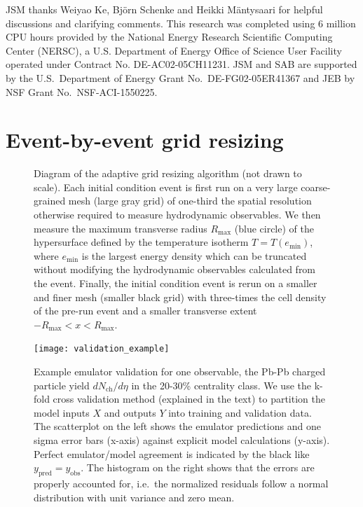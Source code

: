 \documentclass[aps,prc,reprint,amsmath,nofootinbib]{revtex4-1}
\newcommand{\nch}{N_\text{ch}}
\begin{document}
\medskip

\begin{acknowledgments}
  JSM thanks Weiyao Ke, Bj\"orn Schenke and Heikki M\"antysaari for helpful discussions and clarifying comments.
  This research was completed using 6 million CPU hours provided by the National Energy Research Scientific Computing Center (NERSC), a U.S. Department of Energy Office of Science User Facility operated under Contract No. DE-AC02-05CH11231.
  JSM and SAB are supported by the U.S.\ Department of Energy Grant No.\ DE-FG02-05ER41367 and JEB by NSF Grant No.\ NSF-ACI-1550225.
\end{acknowledgments}



\appendix

\section{Event-by-event grid resizing}
\label{app:adaptive_grid}

\begin{figure}
  \caption{
    \label{fig:adaptive_grid}
    Diagram of the adaptive grid resizing algorithm (not drawn to scale).
    Each initial condition event is first run on a very large coarse-grained mesh (large gray grid) of one-third the spatial resolution otherwise required to measure hydrodynamic observables.
    We then measure the maximum transverse radius $R_\text{max}$ (blue circle) of the hypersurface defined by the temperature isotherm $T = T(e_\text{min})$, where $e_\text{min}$ is the largest energy density which can be truncated without modifying the hydrodynamic observables calculated from the event.
    Finally, the initial condition event is rerun on a smaller and finer mesh (smaller black grid) with three-times the cell density of the pre-run event and a smaller transverse extent $-R_\text{max} < x < R_\text{max}$.
  }
\end{figure}

\begin{figure}
  \texttt{[image: validation\_example]}
  \caption{
    \label{fig:validation_example}
    Example emulator validation for one observable, the Pb-Pb charged particle yield $d\nch/d\eta$ in the 20-30\% centrality class.
    We use the k-fold cross validation method (explained in the text) to partition the model inputs $X$ and outputs $Y$ into training and validation data.
    The scatterplot on the left shows the emulator predictions and one sigma error bars (x-axis) against explicit model calculations (y-axis).
    Perfect emulator/model agreement is indicated by the black like $y_\text{pred}=y_\text{obs}$.
    The histogram on the right shows that the errors are properly accounted for, i.e.\ the normalized residuals follow a normal distribution with unit variance and zero mean.
  }
\end{figure}
\end{document}
